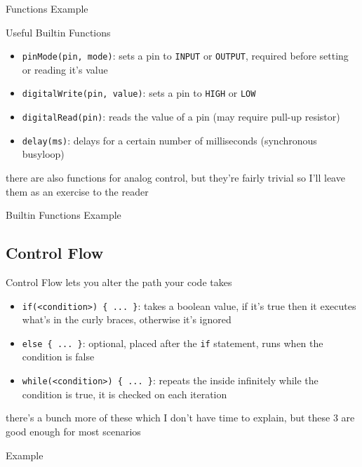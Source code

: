 \documentclass{beamer}
\newcommand{\examplefile}[1]{
	
}
\begin{document}
	\begin{frame}[fragile]{Functions Example}
		\examplefile{functions.cxx}
	\end{frame}

	\begin{frame}[fragile]{Useful Builtin Functions}
		\begin{itemize}
			\item \verb|pinMode(pin, mode)|: sets a pin to \verb|INPUT| or \verb|OUTPUT|, required before setting or reading it's value
			\item \verb|digitalWrite(pin, value)|: sets a pin to \verb|HIGH| or \verb|LOW|
			\item \verb|digitalRead(pin)|: reads the value of a pin (may require pull-up resistor)
			\item \verb|delay(ms)|: delays for a certain number of milliseconds (synchronous busyloop)
		\end{itemize}
		there are also functions for analog control, but they're fairly trivial so I'll leave them as an exercise to the reader
	\end{frame}

	\begin{frame}[fragile]{Builtin Functions Example}
		\examplefile{builtins.cxx}
	\end{frame}

	\subsection{Control Flow}
	\begin{frame}[fragile]{Control Flow}
		lets you alter the path your code takes
		\begin{itemize}
			\item \verb|if(<condition>) { ... }|: takes a boolean value, if it's true then it executes what's in the curly braces, otherwise it's ignored
			\item \verb|else { ... }|: optional, placed after the \verb|if| statement, runs when the condition is false
			\item \verb|while(<condition>) { ... }|: repeats the inside infinitely while the condition is true, it is checked on each iteration
		\end{itemize}
		there's a bunch more of these which I don't have time to explain, but these 3 are good enough for most scenarios
	\end{frame}

	\begin{frame}[fragile]{Example}
		\examplefile{control\_flow.cxx}
	\end{frame}
\end{document}
